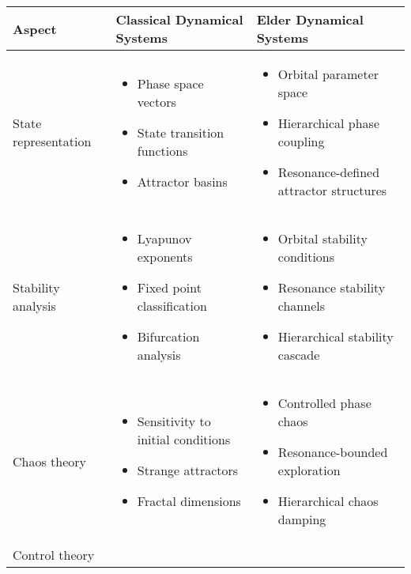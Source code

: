 \begin{table}[h]
\centering
\begin{tabular}{|p{3cm}|p{5cm}|p{5cm}|}
\hline
\textbf{Aspect} & \textbf{Classical Dynamical Systems} & \textbf{Elder Dynamical Systems} \\
\hline
State representation & 
\begin{itemize}
    \item Phase space vectors
    \item State transition functions
    \item Attractor basins
\end{itemize} &
\begin{itemize}
    \item Orbital parameter space
    \item Hierarchical phase coupling
    \item Resonance-defined attractor structures
\end{itemize} \\
\hline
Stability analysis & 
\begin{itemize}
    \item Lyapunov exponents
    \item Fixed point classification
    \item Bifurcation analysis
\end{itemize} &
\begin{itemize}
    \item Orbital stability conditions
    \item Resonance stability channels
    \item Hierarchical stability cascade
\end{itemize} \\
\hline
Chaos theory & 
\begin{itemize}
    \item Sensitivity to initial conditions
    \item Strange attractors
    \item Fractal dimensions
\end{itemize} &
\begin{itemize}
    \item Controlled phase chaos
    \item Resonance-bounded exploration
    \item Hierarchical chaos damping
\end{itemize} \\
\hline
Control theory & 
\begin{itemize}

\end{itemize}
\end{tabular}
\end{table}

